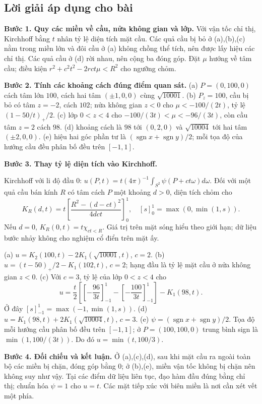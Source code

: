 \documentclass[10pt,a4paper]{article}
\begin{document}
\subsection*{Lời giải áp dụng cho bài}
\textbf{Bước 1. Quy các miền về cầu, nửa không gian và lớp.} Với vận tốc chỉ thị, Kirchhoff bằng $t$ nhân tỷ lệ diện tích mặt cầu. Các quả cầu bị bỏ ở (a),(b),(c) nằm trong miền lớn và đôi cầu ở (a) không chồng thể tích, nên được lấy hiệu các chỉ thị. Các quả cầu ở (d) rời nhau, nên cộng ba đóng góp. Đặt $\mu$ hướng về tâm cầu; điều kiện $r^2+c^2t^2-2rct\mu<R^2$ cho ngưỡng chỏm.

\textbf{Bước 2. Tính các khoảng cách đúng điểm quan sát.} (a) $P=(0,100,0)$ cách tâm lớn $100$, cách hai tâm $(\pm1,0,0)$ cùng $\sqrt{10001}$. (b) $P_z=100$, cầu bị bỏ có tâm $z=-2$, cách $102$; nửa không gian $z<0$ cho $\mu<-100/(2t)$, tỷ lệ $(1-50/t)_+/2$. (c) lớp $0<z<4$ cho $-100/(3t)<\mu<-96/(3t)$, còn cầu tâm $z=2$ cách $98$. (d) khoảng cách là $98$ tới $(0,2,0)$ và $\sqrt{10004}$ tới hai tâm $(\pm2,0,0)$. (e) hiệu hai góc phần tư là $(\operatorname{sgn}x+\operatorname{sgn}y)/2$; mỗi tọa độ của hướng cầu đều phân bố đều trên $[-1,1]$.

\textbf{Bước 3. Thay tỷ lệ diện tích vào Kirchhoff.}

Kirchhoff với li độ đầu 0: $u(P,t)=t(4\pi)^{-1}\int_{S^2}\psi(P+ct\omega)d\omega$. Đối với một quả cầu bán kính $R$ có tâm cách $P$ một khoảng $d>0$, diện tích chỏm cho
\[K_R(d,t)=t\left[\frac{R^2-(d-ct)^2}{4dct}\right]_0^1,\quad [s]_0^1=\max(0,\min(1,s)).\]
Nếu $d=0$, $K_R(0,t)=t\chi_{ct<R}$. Giá trị trên mặt sóng hiểu theo giới hạn; dữ liệu bước nhảy không cho nghiệm cổ điển trên mặt ấy.

(a) $u=K_2(100,t)-2K_1(\sqrt{10001},t)$, $c=2$.
(b) $u=(t-50)_+/2-K_1(102,t)$, $c=2$; hạng đầu là tỷ lệ mặt cầu ở nửa không gian $z<0$.
(c) Với $c=3$, tỷ lệ của lớp $0<z<4$ cho
\[u=\frac t2\left[\left[-\frac{96}{3t}\right]_{-1}^1-\left[-\frac{100}{3t}\right]_{-1}^1\right]-K_1(98,t).\]
Ở đây $[s]_{-1}^1=\max(-1,\min(1,s))$.
(d) $u=K_1(98,t)+2K_1(\sqrt{10004},t)$, $c=3$.
(e) $\psi=(\operatorname{sgn}x+\operatorname{sgn}y)/2$. Tọa độ mỗi hướng cầu phân bố đều trên $[-1,1]$; ở $P=(100,100,0)$ trung bình sign là $\min(1,100/(3t))$. Do đó $u=\min(t,100/3)$.

\textbf{Bước 4. Đối chiếu và kết luận.} Ở (a),(c),(d), sau khi mặt cầu ra ngoài toàn bộ các miền bị chặn, đóng góp bằng $0$; ở (b),(e), miền vận tốc không bị chặn nên không suy như vậy. Tại các điểm dữ liệu liên tục, đạo hàm đầu đúng bằng chỉ thị; chuẩn hóa $\psi=1$ cho $u=t$. Các mặt tiếp xúc với biên miền là nơi cần xét vết một phía.
\end{document}
